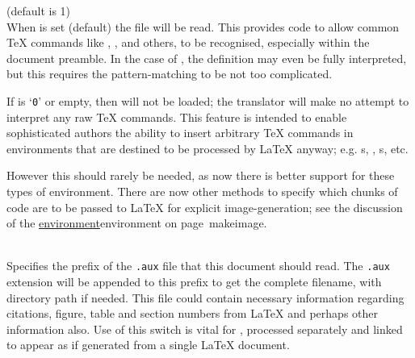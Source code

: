 \begin{htmllist}
%
%

\begin{changebar}%
\item [ -no\_tex\_defs\label{notexdefs}]
 (default is 1)\\
When  is set (default) the file  will be read.
This provides code to allow common \TeX{} commands like , ,
 and others, to be recognised, especially within the document preamble.
In the case of , the definition may even be fully interpreted,
but this requires the pattern-matching to be not too complicated.

If  is `\texttt{0}' or empty, then  will not be loaded;
the translator will make no attempt to interpret any raw \TeX{} commands.  
This feature is intended to enable sophisticated authors the ability to insert 
arbitrary \TeX{} commands in environments that are destined 
to be processed by \LaTeX{} anyway; 
e.g. s, , s, etc.
\begin{changebar}%
However this should rarely be needed, as now there is better support for these
types of environment. There are now other methods to specify which chunks of code 
are to be passed to \LaTeX{} for explicit image-generation; 
see the discussion of the  
\hyperref[page]{environment}{environment on page~}{}{makeimage}.
\end{changebar}


%

\item [ -external\_file \Meta{filename}\label{externalfile}] 
\\
Specifies the prefix of the \texttt{.aux} file that this document should read.
The \texttt{.aux} extension will be appended to this prefix 
to get the complete filename, with directory path if needed.\html{\\}  
This file could contain necessary information 
regarding citations, figure, table and section numbers from \LaTeX{} 
and perhaps other information also.
Use of this switch is vital for , 
processed separately and linked to appear as if generated 
from a single \LaTeX{} document.%


\end{changebar}
\end{htmllist}
